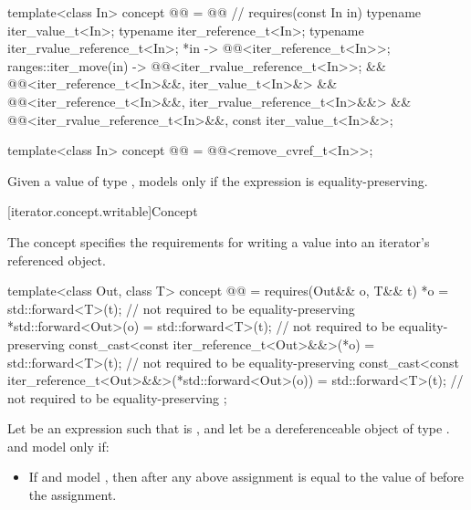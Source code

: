 \begin{codeblock}
template<class In>
  concept @@ = @\itcorr[-1]@                   // \expos
    requires(const In in) {
      typename iter_value_t<In>;
      typename iter_reference_t<In>;
      typename iter_rvalue_reference_t<In>;
      { *in } -> @@<iter_reference_t<In>>;
      { ranges::iter_move(in) } -> @@<iter_rvalue_reference_t<In>>;
    } &&
    @@<iter_reference_t<In>&&, iter_value_t<In>&> &&
    @@<iter_reference_t<In>&&, iter_rvalue_reference_t<In>&&> &&
    @@<iter_rvalue_reference_t<In>&&, const iter_value_t<In>&>;
\end{codeblock}

\begin{codeblock}
template<class In>
  concept @@ =
    @@<remove_cvref_t<In>>;
\end{codeblock}

\pnum
Given a value  of type ,  models 
only if the expression  is equality-preserving.

[iterator.concept.writable]{Concept }

\pnum
The  concept specifies the requirements
for writing a value into an iterator's referenced object.

\begin{codeblock}
template<class Out, class T>
  concept @@ =
    requires(Out&& o, T&& t) {
      *o = std::forward<T>(t);                          // not required to be equality-preserving
      *std::forward<Out>(o) = std::forward<T>(t);       // not required to be equality-preserving
      const_cast<const iter_reference_t<Out>&&>(*o) =
        std::forward<T>(t);                             // not required to be equality-preserving
      const_cast<const iter_reference_t<Out>&&>(*std::forward<Out>(o)) =
        std::forward<T>(t);                             // not required to be equality-preserving
    };
\end{codeblock}

\pnum
Let  be an expression such that  is ,
and let  be a dereferenceable object of type .
 and  model  only if:
\begin{itemize}
\item If  and  model
  ,
  then  after any above assignment is equal to
  the value of  before the assignment.
\end{itemize}

